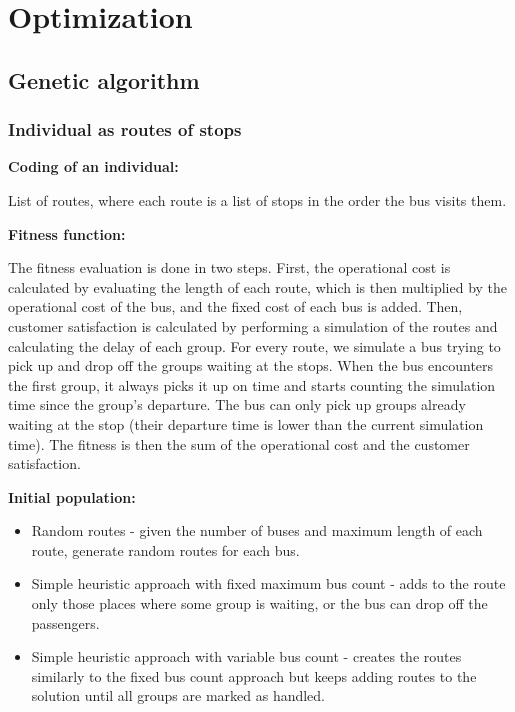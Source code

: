 \chapter{Optimization}

\section{Genetic algorithm}


\subsection{Individual as routes of stops}


\textbf{Coding of an individual:}

List of routes, where each route is a list of stops in the order the bus visits them.

\textbf{Fitness function:}

The fitness evaluation is done in two steps. First, the operational cost is calculated by evaluating the length of each route, which is then multiplied by the operational cost of the bus, and the fixed cost of each bus is added. Then, customer satisfaction is calculated by performing a simulation of the routes and calculating the delay of each group. For every route, we simulate a bus trying to pick up and drop off the groups waiting at the stops. When the bus encounters the first group, it always picks it up on time and starts counting the simulation time since the group's departure. The bus can only pick up groups already waiting at the stop (their departure time is lower than the current simulation time).  
The fitness is then the sum of the operational cost and the customer satisfaction.

\textbf{Initial population:}

\begin{itemize}
    \item Random routes - given the number of buses and maximum length of each route, generate random routes for each bus.
    \item Simple heuristic approach with fixed maximum bus count - adds to the route only those places where some group is waiting, or the bus can drop off the passengers.
    \item Simple heuristic approach with variable bus count - creates the routes similarly to the fixed bus count approach but keeps adding routes to the solution until all groups are marked as handled.
\end{itemize}

